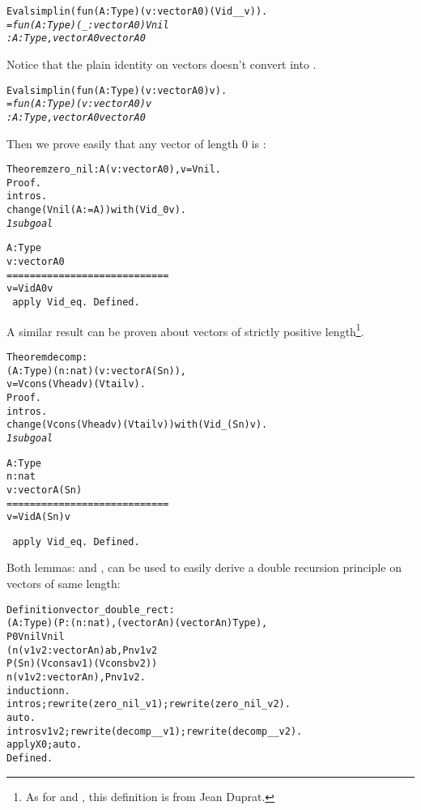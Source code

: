 \documentclass[11pt]{article}
\begin{document}
\begin{alltt}
Eval simpl in (fun (A:Type)(v:vector A 0) {\funarrow} (Vid _ _ v)).
\it = fun (A : Type) (_ : vector A 0) {\funarrow} Vnil
     : {\prodsym} A : Type, vector A 0 {\arrow} vector A 0

\end{alltt}

Notice that the plain identity on vectors doesn't convert 
into .
\begin{alltt}
Eval simpl in (fun (A:Type)(v:vector A 0) {\funarrow} v).
\it = fun (A : Type) (v : vector A 0) {\funarrow} v
     : {\prodsym} A : Type, vector A 0 {\arrow} vector A 0
\end{alltt}

Then we prove easily that any vector of length 0 is :

\begin{alltt}
Theorem zero_nil : {\prodsym} A (v:vector A 0), v = Vnil.
Proof.
 intros.
 change (Vnil (A:=A)) with (Vid _ 0 v).
\it
1 subgoal

  A : Type
  v : vector A 0
  ============================
   v = Vid A 0 v
\tt
 apply Vid_eq.
Defined.
\end{alltt}

A similar result can be proven about vectors of strictly positive
length\footnote{As for  and , this definition
is from Jean Duprat.}.

\begin{alltt}


Theorem decomp :
  {\prodsym} (A : Type) (n : nat) (v : vector A (S n)),
  v = Vcons (Vhead v) (Vtail v).
Proof.
 intros.
 change (Vcons (Vhead v) (Vtail v)) with (Vid _  (S n) v).
\it
 1 subgoal

  A : Type
  n : nat
  v : vector A (S n)
  ============================
   v = Vid A (S n) v

\tt{} apply Vid_eq.
Defined.
\end{alltt}


Both lemmas:  and ,
can be used to easily derive a double recursion principle
on vectors of same length:


\begin{alltt}
Definition vector_double_rect :
 {\prodsym} (A:Type) (P: {\prodsym} (n:nat),(vector A n){\arrow}(vector A n) {\arrow} Type),
     P 0 Vnil Vnil {\arrow}
     ({\prodsym} n (v1 v2 : vector A n) a b, P n v1 v2 {\arrow}
          P (S n) (Vcons a v1) (Vcons  b v2)) {\arrow}
     {\prodsym} n (v1 v2 : vector A n), P n v1 v2.
 induction n.
 intros; rewrite (zero_nil _ v1); rewrite (zero_nil _ v2).
 auto.
 intros v1 v2; rewrite (decomp _ _ v1);rewrite (decomp _ _ v2).
 apply X0; auto.
Defined.
\end{alltt}
\end{document}
